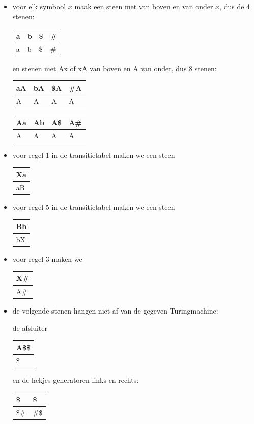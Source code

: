 \begin{itemize}
\item voor elk symbool $x$ maak een steen met van boven en van onder
$x$, dus de 4 stenen:
\begin{tabular}{|l||l||l||l|}
\hline
a & b & \$ & \# \\ \hline
a & b & \$ & \# \\
\hline
\end{tabular}
en stenen met Ax of xA van boven en A van onder, dus 8 stenen:
\begin{tabular}{|l||l||l||l|}
\hline
aA & bA & \$A & \#A \\ \hline
A & A & A & A \\
\hline
\end{tabular}
\begin{tabular}{|l||l||l||l|}
\hline
Aa & Ab & A\$ & A\# \\ \hline
A & A & A & A \\
\hline
\end{tabular}

\item voor regel 1 in de transitietabel maken we een steen
\begin{tabular}{|l|}
\hline
Xa \\ \hline
aB \\
\hline
\end{tabular}

\item voor regel 5 in de transitietabel maken we een steen
\begin{tabular}{|l|}
\hline
Bb \\ \hline
bX \\
\hline
\end{tabular}

\item
voor regel 3 maken we
\begin{tabular}{|l|}
\hline
X\# \\ \hline
A\# \\
\hline
\end{tabular}


\item
de volgende stenen hangen niet af van de gegeven Turingmachine:

de afsluiter
\begin{tabular}{|l|}
\hline
A\$\$                     \\ \hline
   \$                     \\ 
\hline
\end{tabular}
en de hekjes generatoren links en rechts:
\begin{tabular}{|l||l|}
\hline
        \$   & \$         \\ \hline
        \$\# & \#\$       \\ 
\hline
\end{tabular}


\end{itemize}
